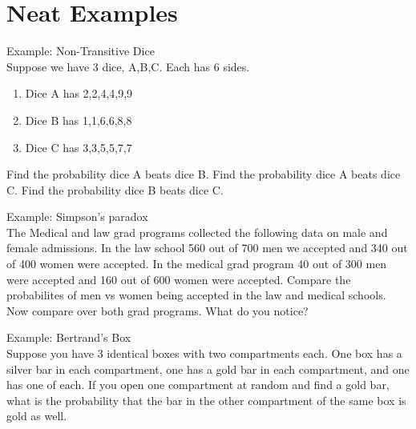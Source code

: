 \documentclass[14,fleqn]{article}
\begin{document}
\section{Neat Examples}
Example: Non-Transitive Dice\\
Suppose we have 3 dice, A,B,C. Each has 6 sides.
\begin{enumerate}
	\item Dice A has 2,2,4,4,9,9
	\item Dice B has 1,1,6,6,8,8
	\item Dice C has 3,3,5,5,7,7
\end{enumerate}
Find the probability dice A beats dice B. Find the probability dice A beats dice C. Find the probability dice B beats dice C.


Example: Simpson's paradox\\
The Medical and law grad programs collected the following data on male and female admissions. In the law school 560 out of 700 men we accepted and 340 out of 400 women were accepted. In the medical grad program 40 out of 300 men were accepted and 160 out of 600 women were accepted. Compare the probabilites of men vs women being accepted in the law and medical schools. Now compare over both grad programs. What do you notice?

Example: Bertrand's Box\\
Suppose you have 3 identical boxes with two compartments each. One box has a silver bar in each compartment, one has a gold bar in each compartment, and one has one of each. If you open one compartment at random and find a gold bar, what is the probability that the bar in the other compartment of the same box is gold as well.
\end{document}
